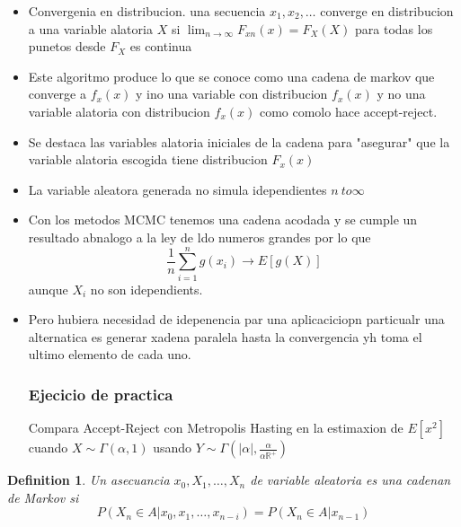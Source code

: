 \documentclass[10pt, oneside]{article}
\newcommand{\R}{\mathbb{R}}
\newtheorem{defn}{Definition}
\begin{document}
\begin{itemize}
	\item Convergenia en distribucion. una secuencia $x_1,x_2,\ldots$ converge en distribucion a una variable
	      alatoria $X$ si $\lim_{n \to \infty} F_{xn}(x) = F_X(X)$ para todas
	      los punetos desde $F_X$ es continua

	\item Este algoritmo produce lo que se conoce como una cadena de markov que converge a $f_x(x)$ y ino una variable
	      con distribucion $f_x(x)$ y no una variable alatoria con distribucion $f_x(x)$ como comolo hace accept-reject.

	\item Se destaca las variables alatoria iniciales de la cadena para "asegurar" que la variable
	      alatoria escogida tiene distribucion $F_x(x)$

	\item La variable aleatora generada no simula idependientes $n\ to \infty$

	\item Con los metodos MCMC tenemos una cadena acodada y se cumple un resultado
	      abnalogo a la ley de ldo numeros grandes por lo que
	      $$
		      \frac{1}{n} \sum_{i=1}^n g(x_i) \to E[g(X)]
	      $$
	      aunque $X_i$ no son idependients.

	\item Pero hubiera necesidad de idepenencia par una aplicaciciopn particualr
	      una alternatica es generar xadena paralela hasta la convergencia yh toma el ultimo elemento de
	      cada uno.
	      \subsubsection{Ejecicio de practica}

	      Compara Accept-Reject con Metropolis Hasting en la estimaxion de $E[x^2]$ cuando $X\sim \Gamma(\alpha,1)$
	      usando $Y \sim \Gamma(|\alpha|,\frac{\alpha}{\alpha \R^+})$
\end{itemize}

\begin{defn}
	Un asecuancia $x_0,X_1,\ldots, X_n$ de variable aleatoria es una cadenan de Markov si
	$$
		P(X_n\in A | x_0,x_1,\ldots,x_{n-i}) = P(X_n \in A | x_{n-1})
	$$
\end{defn}
\end{document}
